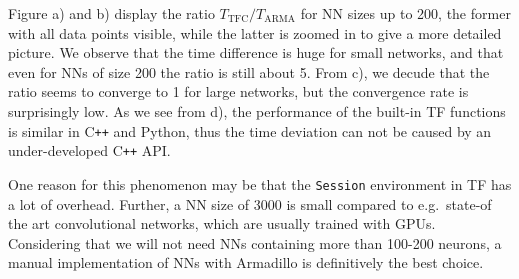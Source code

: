 \documentclass[twoside,english]{uiofysmaster}
\begin{document}

Figure a) and b) display the ratio $T_{\mathrm{TFC}}/T_{\mathrm{ARMA}}$ for NN sizes up to 200, the former with all data points 
visible, while the latter is zoomed in to give a more detailed picture. We observe that the time difference is huge 
for small networks, and that even for NNs of size 200 the ratio is still about 5. From c), we decude that the ratio seems to converge 
to 1 for large networks, but the convergence rate is surprisingly low. 
As we see from d), the performance of the built-in TF functions is similar 
in C\texttt{++} and Python, thus the time deviation can not be caused by an under-developed C\texttt{++} API. 

One reason for this phenomenon may be that the \texttt{Session} environment in TF has a lot of overhead. 
Further, a NN size of 3000 is small compared to e.g.\ state-of the art convolutional networks, which are usually trained with GPUs. 
Considering that we will not need NNs containing more than 100-200 neurons, a manual implementation of NNs with Armadillo 
is definitively the best choice. 
\end{document}
